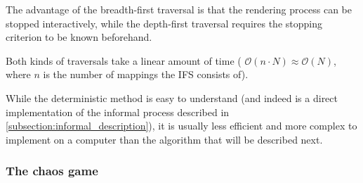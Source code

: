 \documentclass[11pt]{article}
\begin{document}
The advantage of the breadth-first traversal is that the rendering process can be stopped interactively,
while the depth-first traversal requires the stopping criterion to be known beforehand. \cite{hepting1991rendering}

Both kinds of traversals take a linear amount of time ( \(\mathcal{O}(n \cdot N) \approx \mathcal{O}(N)\), where \(n\) is the number of mappings the IFS consists of).

While the deterministic method is easy to understand (and indeed is a direct implementation of the informal process described in \autoref{subsection:informal_description}),
it is usually less efficient and more complex to implement on a computer than the algorithm that will be described next.

\subsubsection{The chaos game}
\label{sec:orgf50515e}
\label{subsection:chaos_game}
\end{document}
